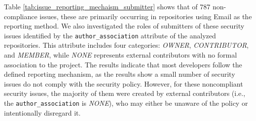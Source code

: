 Table \ref{tab:issue_reporting_mechaism_submitter} shows that of 787 non-compliance issues, these are primarily occurring in repositories using Email as the reporting method. 
We also investigated the roles of submitters of these security issues identified by the \texttt{author\_association} attribute of the analyzed repositories. This attribute includes four categories: \textit{OWNER}, \textit{CONTRIBUTOR}, and \textit{MEMBER}, while \textit{NONE} represents external contributors with no formal association to the project. 
The results indicate that most developers follow the defined reporting mechanism, as the results show a small number of security issues do not comply with the security policy. However, for these noncompliant security issues, the majority of them were created by external contributors (i.e., the \texttt{author\_association} is \textit{NONE}), who may either be unaware of the policy or intentionally disregard it.





